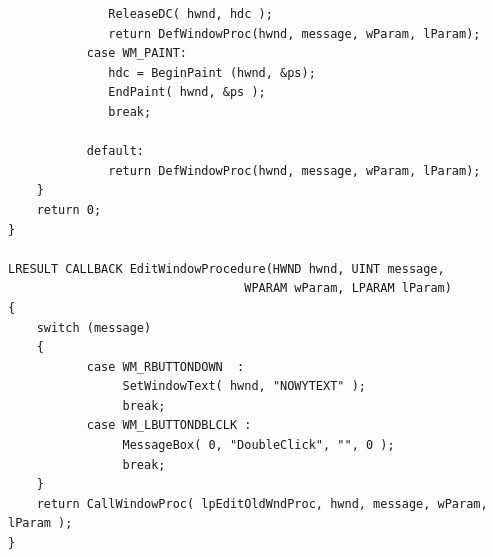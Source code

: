 \begin{scriptsize}
\begin{verbatim}
              ReleaseDC( hwnd, hdc );                
              return DefWindowProc(hwnd, message, wParam, lParam);
           case WM_PAINT:
              hdc = BeginPaint (hwnd, &ps);  
              EndPaint( hwnd, &ps );
              break;   
              
           default:                   
              return DefWindowProc(hwnd, message, wParam, lParam);
    }
    return 0;
}

LRESULT CALLBACK EditWindowProcedure(HWND hwnd, UINT message, 
                                 WPARAM wParam, LPARAM lParam)
{
    switch (message)                  
    {
           case WM_RBUTTONDOWN  :  
                SetWindowText( hwnd, "NOWYTEXT" );
                break;
           case WM_LBUTTONDBLCLK : 
                MessageBox( 0, "DoubleClick", "", 0 );
                break; 
    }
    return CallWindowProc( lpEditOldWndProc, hwnd, message, wParam, lParam );
}
\end{verbatim}
\end{scriptsize}
